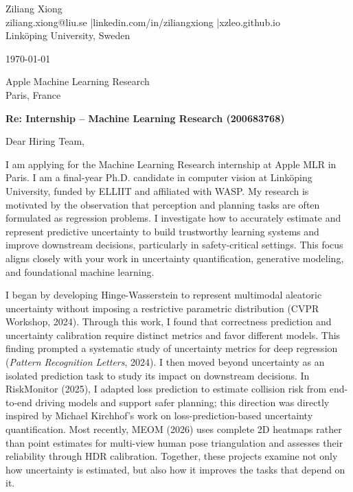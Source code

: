 \documentclass[11pt,a4paper]{article}
\begin{document}
\begin{flushright}
Ziliang Xiong\\
ziliang.xiong@liu.se \quad|\quad linkedin.com/in/ziliangxiong \quad|\quad xzleo.github.io\\
Linköping University, Sweden
\end{flushright}

\vspace{1em}
\today

\vspace{1em}
Apple Machine Learning Research\\
Paris, France

\vspace{1em}
\textbf{Re: Internship -- Machine Learning Research (200683768)}

\vspace{0.5em}
Dear Hiring Team,

I am applying for the Machine Learning Research internship at Apple MLR in Paris. I am a final-year Ph.D. candidate in computer vision at Linköping University, funded by ELLIIT and affiliated with WASP. My research is motivated by the observation that perception and planning tasks are often formulated as regression problems. I investigate how to accurately estimate and represent predictive uncertainty to build trustworthy learning systems and improve downstream decisions, particularly in safety-critical settings. This focus aligns closely with your work in uncertainty quantification, generative modeling, and foundational machine learning.

I began by developing Hinge-Wasserstein to represent multimodal aleatoric uncertainty without imposing a restrictive parametric distribution (CVPR Workshop, 2024). Through this work, I found that correctness prediction and uncertainty calibration require distinct metrics and favor different models. This finding prompted a systematic study of uncertainty metrics for deep regression (\emph{Pattern Recognition Letters}, 2024). I then moved beyond uncertainty as an isolated prediction task to study its impact on downstream decisions. In RiskMonitor (2025), I adapted loss prediction to estimate collision risk from end-to-end driving models and support safer planning; this direction was directly inspired by Michael Kirchhof's work on loss-prediction-based uncertainty quantification. Most recently, MEOM (2026) uses complete 2D heatmaps rather than point estimates for multi-view human pose triangulation and assesses their reliability through HDR calibration. Together, these projects examine not only how uncertainty is estimated, but also how it improves the tasks that depend on it.
\end{document}
